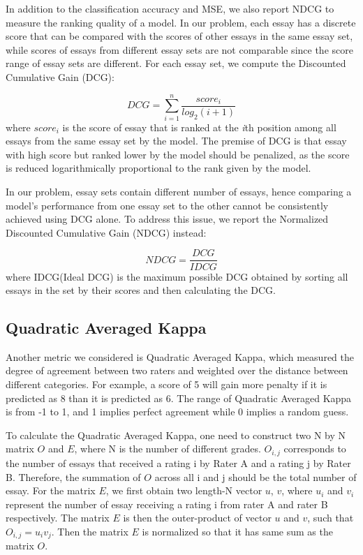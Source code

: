 \documentclass[10pt,psamsfonts]{amsart}
\theoremstyle{definition}
\theoremstyle{remark}
\numberwithin{equation}{section}
\begin{document}
In addition to the classification accuracy and MSE, we also report NDCG to measure the ranking quality of a model. In our problem, each essay has a discrete score that can be compared with the scores of other essays in the same essay set, while scores of essays from different essay sets are not comparable since the score range of essay sets are different. For each essay set, we compute the Discounted Cumulative Gain (DCG):
 
$$DCG=\sum_{i=1}^n\frac{score_i}{log_2(i+1)}$$
where $score_i$ is the score of essay that is ranked at the \textit{i}th position among all essays from the same essay set by the model. The premise of DCG is that essay with high score but ranked lower by the model should be penalized, as the score is reduced logarithmically proportional to the rank given by the model.

In our problem, essay sets contain different number of essays, hence comparing a model's performance from one essay set to the other cannot be consistently achieved using DCG alone. To address this issue, we report the Normalized Discounted Cumulative Gain (NDCG) instead:

$$NDCG=\frac{DCG}{IDCG}$$
where IDCG(Ideal DCG) is the maximum possible DCG obtained by sorting all essays in the set by their scores and then calculating the DCG.

\subsection*{Quadratic Averaged Kappa}
Another metric we considered is Quadratic Averaged Kappa, which measured the degree of agreement between two raters and weighted over the distance between different categories. For example, a score of 5 will gain more penalty if it is predicted as 8 than it is predicted as 6. The range of Quadratic Averaged Kappa is from -1 to 1, and 1 implies perfect agreement while 0 implies a random guess. 

To calculate the Quadratic Averaged Kappa, one need to construct two N by N matrix $O$ and $E$, where N is the number of different grades. $O_{i,j}$ corresponds to the number of essays that received a rating i by Rater A and a rating j by Rater B. Therefore, the summation of $O$ across all i and j should be the total number of essay. For the matrix $E$, we first obtain two length-N vector $u$, $v$, where $u_i$ and $v_i$ represent the number of essay receiving a rating i from rater A and rater B respectively. The matrix $E$ is then the outer-product of vector $u$ and $v$, such that $O_{i,j} = u_i v_j$. Then the matrix $E$ is normalized so that it has same sum as the matrix $O$.
\end{document}
